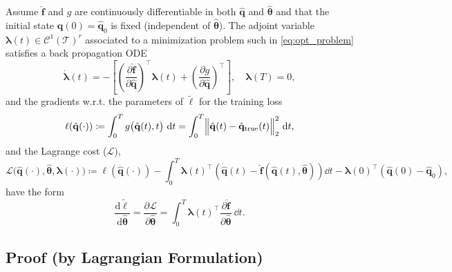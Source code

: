 \begin{theorem}
    \label{thm:adjoint_method}
    Assume $\hat{\mathbf{f}}$ and $g$ are continuously differentiable in both $\hat{\mathbf{q}}$ and $\hat{\bm{\theta}}$ and that the initial state $\hat{\mathbf{q}}(0)=\hat{\mathbf{q}}_0$ is fixed (independent of $\hat{\bm{\theta}}$). The adjoint variable $\bm{\lambda}(t)\in\mathcal{C}^1(\mathcal{T})^r$ associated to a minimization problem such in \eqref{eq:opt_problem} satisfies a back propagation ODE\\ 
    \begin{equation}
        \dot{\bm{\lambda}}(t) = -\left[ \left(\dfrac{\partial \hat{\mathbf{f}}}{\partial\hat{\mathbf{q}}}\right)^{\top}\bm{\lambda}(t) + \left( \dfrac{\partial g}{\partial \hat{\mathbf{q}}} \right)^{\top} \right],\quad\bm{\lambda}(T)=0,
        \label{eq:adjoint_eqs}
    \end{equation}
    and the gradients w.r.t. the parameters of $\tilde\ell$ for the training loss\\
    \begin{equation*}
        \ell(\hat{\mathbf{q}}(\cdot)) \coloneqq \displaystyle\int_0^T g\bigl(\hat{\mathbf{q}}(t),t\bigr)~\dd t = \int_0^T \Bigl\|\hat{\mathbf{q}}(t) - \hat{\mathbf{q}}_{\mathrm{true}}(t)\Bigr\|_2^2~\dd t,
    \end{equation*}
    and the Lagrange cost ($\mathscr{L}$),\\
    \begin{equation*}
        \mathscr{L}\bigl(\hat{\mathbf{q}}(\cdot),\hat{\bm{\theta}},\bm{\lambda}(\cdot)\bigr) \coloneqq \ell(\hat{\mathbf{q}}(\cdot)) - \int_0^T \bm{\lambda}(t)^{\top}\left( \dot{\hat{\mathbf{q}}}(t)-\hat{\mathbf{f}}(\hat{\mathbf{q}}(t),\hat{\bm{\theta}}) \right)\dd t - \bm{\lambda}(0)^{\top}(\hat{\mathbf{q}}(0)-\hat{\mathbf{q}}_0),
        \label{eq:lagrange_cost2}
    \end{equation*}
    have the form\\
    \begin{equation}
        \dfrac{\mathrm{d} \tilde{\ell}}{\mathrm{d} \hat{\bm{\theta}}} = \dfrac{\partial \mathscr{L}}{\partial\hat{\bm{\theta}}} = \int_0^T \bm{\lambda}(t)^{\top}\dfrac{\partial\hat{\mathbf{f}}}{\partial\hat{\bm{\theta}}}~\dd t.
        \label{eq:gradient_lagrange}
    \end{equation}
\end{theorem}

\subsection*{Proof (by Lagrangian Formulation)}

